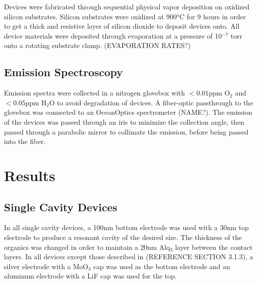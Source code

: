 \documentclass{report}
\begin{document}
    Devices were fabricated through sequential physical vapor deposition on oxidized silicon substrates. Silicon substrates were oxidized at 900$^o$C for 9 hours in order to get a thick and resistive layer of silicon dioxide to deposit devices onto. All device materials were deposited through evaporation at a pressure of 10$^{-7}$ torr onto a rotating substrate clamp. (EVAPORATION RATES?)

    \section{Emission Spectroscopy}
    Emission spectra were collected in a nitrogen glovebox with $<0.01$ppm O$_2$ and $<0.05$ppm H$_2$O to avoid degradation of devices. A fiber-optic passthrough to the glovebox was connected to an OceanOptics spectrometer (NAME?). The emission of the devices was passed through an iris to minimize the collection angle, then passed through a parabolic mirror to collimate the emission, before being passed into the fiber.

\chapter{Results}

    \section{Single Cavity Devices}
    
        In all single cavity devices, a 100nm bottom electrode was used with a 30nm top electrode to produce a resonant cavity of the desired size. The thickness of the organics was changed in order to maintain a 20nm Alq$_3$ layer between the contact layers. In all devices except those described in (REFERENCE SECTION 3.1.3), a silver electrode with a MoO$_3$ cap was used as the bottom electrode and an aluminum electrode with a LiF cap was used for the top.
        
\end{document}
